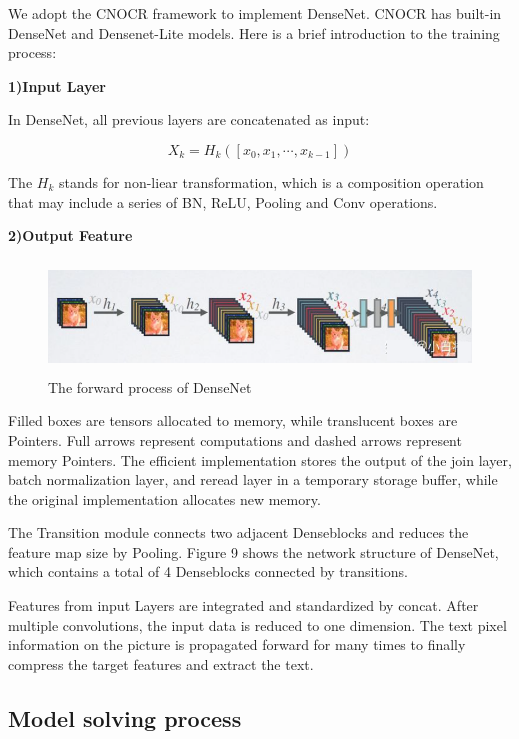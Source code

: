 \documentclass{apmcmthesis}
\begin{document}
	We adopt the CNOCR framework to implement DenseNet. CNOCR has built-in DenseNet and Densenet-Lite models. Here is a brief introduction to the training process:
	
\noindent\textbf{1)Input Layer}
		
		In DenseNet, all previous layers are concatenated as input:
		
		\begin{equation}
			\tag{5-2-1}
			  X_{k} = H_{k}([x_{0},x_{1},\cdots,x_{k-1}])
			\end{equation}
		
		The $H_{k}$ stands for non-liear transformation, which is a composition operation that may include a series of BN, ReLU, Pooling and Conv operations.


\noindent\textbf{2)Output Feature}

	\begin{figure}
		\centering
		\includegraphics[height=3cm]{./figures/5-7.png}
		\caption{The forward process of DenseNet}
		\label{fig:8}
	\end{figure}
	
	Filled boxes are tensors allocated to memory, while translucent boxes are Pointers. Full arrows represent computations and dashed arrows represent memory Pointers. The efficient implementation stores the output of the join layer, batch normalization layer, and reread layer in a temporary storage buffer, while the original implementation allocates new memory.
		
	The Transition module connects two adjacent Denseblocks and reduces the feature map size by Pooling. Figure 9 shows the network structure of DenseNet, which contains a total of 4 Denseblocks connected by transitions.

	Features from input Layers are integrated and standardized by concat. After multiple convolutions, the input data is reduced to one dimension. The text pixel information on the picture is propagated forward for many times to finally compress the target features and extract the text.

\subsection{Model solving process}
	
\end{document}
